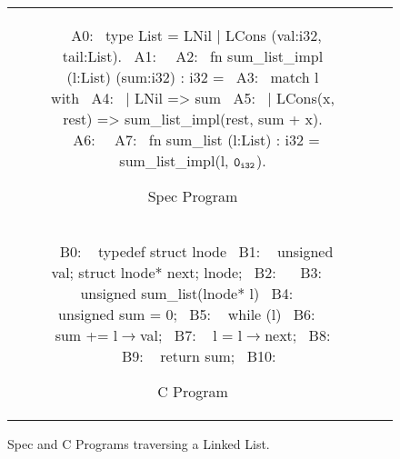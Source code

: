 \begin{figure}
\begin{tabular}{cc}
\begin{subfigure}[b]{\textwidth}
\begin{center}
\begin{allLangEnvFoot}
~{\scriptsize \textcolor{mygray}{A0:}}~ type List = LNil | LCons (val:i32, tail:List).
~{\scriptsize \textcolor{mygray}{A1:}}~
~{\scriptsize \textcolor{mygray}{A2:}}~ fn sum_list_impl (l:List) (sum:i32) : i32 =
~{\scriptsize \textcolor{mygray}{A3:}}~    match l with
~{\scriptsize \textcolor{mygray}{A4:}}~    | LNil => sum
~{\scriptsize \textcolor{mygray}{A5:}}~    | LCons(x, rest) => sum_list_impl(rest, sum + x).
~{\scriptsize \textcolor{mygray}{A6:}}~
~{\scriptsize \textcolor{mygray}{A7:}}~ fn sum_list (l:List) : i32 = sum_list_impl(l, ${\tt 0_{i32}}$).
\end{allLangEnvFoot}
\end{center}
\caption{\label{fig:llTraverseSpec}Spec Program}
\end{subfigure}%
\\
\begin{subfigure}[b]{\textwidth}
\begin{center}
\begin{allLangEnvFoot}
~{\scriptsize \textcolor{mygray}{B0: }}~ typedef struct lnode {
~{\scriptsize \textcolor{mygray}{B1: }}~   unsigned val; struct lnode* next; } lnode;
~{\scriptsize \textcolor{mygray}{B2: }}~ 
~{\scriptsize \textcolor{mygray}{B3: }}~ unsigned sum_list(lnode* l) {
~{\scriptsize \textcolor{mygray}{B4: }}~   unsigned sum = 0;
~{\scriptsize \textcolor{mygray}{B5: }}~   while (l) {
~{\scriptsize \textcolor{mygray}{B6: }}~     sum += l$\rightarrow$val;
~{\scriptsize \textcolor{mygray}{B7: }}~     l = l$\rightarrow$next;
~{\scriptsize \textcolor{mygray}{B8: }}~   }
~{\scriptsize \textcolor{mygray}{B9: }}~   return sum;
~{\scriptsize \textcolor{mygray}{B10:}}~ }
\end{allLangEnvFoot}
\end{center}
\caption{\label{fig:llTraverseC}C Program}
\end{subfigure}%
\\
\end{tabular}
\caption{\label{fig:llTraverseSpecAndC}Spec and C Programs traversing a Linked List.}
\end{figure}
